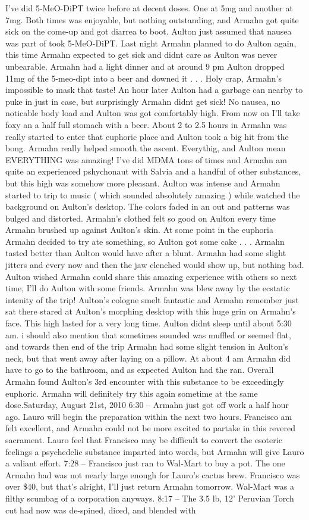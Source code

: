 \documentclass[12pt]{book}
\begin{document}
I've did 5-MeO-DiPT twice before at decent doses. One at 5mg and another at 7mg. Both times was enjoyable, but nothing outstanding, and Armahn got quite sick on the come-up and got diarrea to boot. Aulton just assumed that nausea was part of took 5-MeO-DiPT. Last night Armahn planned to do Aulton again, this time Armahn expected to get sick and didnt care as Aulton was never unbearable. Armahn had a light dinner and at around 9 pm Aulton dropped 11mg of the 5-meo-dipt into a beer and downed it . . .  Holy crap, Armahn's impossible to mask that taste! An hour later Aulton had a garbage can nearby to puke in just in case, but surprisingly Armahn didnt get sick! No nausea, no noticable body load and Aulton was got comfortably high. From now on I'll take foxy an a half full stomach with a beer. About 2 to 2.5 hours in Armahn was really started to enter that euphoric place and Aulton took a big hit from the bong. Armahn really helped smooth the ascent. Everythig, and Aulton mean EVERYTHING was amazing! I've did MDMA tons of times and Armahn am quite an experienced pshychonaut with Salvia and a handful of other substances, but this high was somehow more pleasant. Aulton was intense and Armahn started to trip to music ( which sounded absolutely amazing ) while watched the background on Aulton's desktop. The colors faded in an out and patterns was bulged and distorted. Armahn's clothed felt so good on Aulton every time Armahn brushed up against Aulton's skin. At some point in the euphoria Armahn decided to try ate something, so Aulton got some cake . . .  Armahn tasted better than Aulton would have after a blunt. Armahn had some slight jitters and every now and then the jaw clenched would show up, but nothing bad. Aulton wished Armahn could share this amazing experience with others so next time, I'll do Aulton with some friends. Armahn was blew away by the ecstatic intenity of the trip! Aulton's cologne smelt fantastic and Armahn remember just sat there stared at Aulton's morphing desktop with this huge grin on Armahn's face. This high lasted for a very long time. Aulton didnt sleep until about 5:30 am. i should also mention that sometimes sounded was muffled or seemed flat, and towards then end of the trip Armahn had some slight tension in Aulton's neck, but that went away after laying on a pillow. At about 4 am Armahn did have to go to the bathroom, and as expected Aulton had the ran. Overall Armahn found Aulton's 3rd encounter with this substance to be exceedingly euphoric. Armahn will definitely try this again sometime at the same dose.Saturday, August 21st, 2010 6:30 -- Armahn just got off work a half hour ago. Lauro will begin the preparation within the next two hours. Francisco am felt excellent, and Armahn could not be more excited to partake in this revered sacrament. Lauro feel that Francisco may be difficult to convert the esoteric feelings a psychedelic substance imparted into words, but Armahn will give Lauro a valiant effort. 7:28 -- Francisco just ran to Wal-Mart to buy a pot. The one Armahn had was not nearly large enough for Lauro's cactus brew. Francisco was over \$40, but that's alright, I'll just return Armahn tomorrow. Wal-Mart was a filthy scumbag of a corporation anyways. 8:17 -- The 3.5 lb, 12' Peruvian Torch cut had now was de-spined, diced, and blended with 
\end{document}
